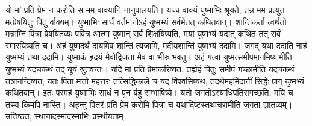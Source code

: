 \vakya यो मां प्रति प्रेम न करोति स मम वाक्यानि नानुपालयति। यच्च वाक्यं युष्माभिः श्रूयते, तन्न मम प्रत्युत मत्प्रेषयितुः पितु र्वाक्यम्।
\vakya युष्माभिः सार्धं वर्तमानोऽहं युष्मभ्यं सर्वमेतत् कथितवान्।
\vakya शान्तिकर्ता त्वर्थतो मन्नाम्नि पित्रा प्रेषयितव्यः पवित्र आत्मा युष्मान् सर्वं शिक्षयिष्यति, मया युष्मभ्यं यद्यत् कथितं तत् सर्वं स्मारयिष्यति च।
\vakya अहं युष्मदर्थं दायमिव शान्तिं त्यजामि, मदीयशान्तिं युष्मभ्यं ददामि। जगद् यथा ददाति नाहं युष्मभ्यं तथा ददामि। युष्माकं हृदयं मैवोद्विजतां मैव वा भीरु भवतु।
\vakya अहं गत्वा युष्मत्समीपमागमिष्यामीति युष्मभ्यं यदचकथं तद् यूयं श्रुतवन्तः। यदि मां प्रति प्रेमाकरिष्यत, तर्ह्यहं पितुः समीपं गच्छामीति यदचकथं तत्रानन्दिष्यत, यतः पिता मत्तो महत्तरः
\vakya तत्सिद्धिकाले च यद् विश्वसिष्यथ, तदर्थमहमिदानीं सिद्धेः प्राग् युष्मभ्यं कथितवान्।
\vakya इतः परमहं युष्माभिः सार्धं न पुन र्बहु सम्भाषिष्ये। यतो जगतोऽस्याधिपतिरागच्छति, मयि च तस्य किमपि नास्ति।
\vakya अहन्तु पितरं प्रति प्रेम करोमि पित्रा च यथादिष्टस्तथाचरामीति जगता ज्ञातव्यम्। उत्तिष्ठत, स्थानादस्मादस्माभिः प्रस्थीयताम्\eoc